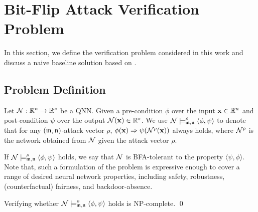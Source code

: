 \section{Bit-Flip Attack Verification Problem}\label{sec:pro}

In this section, we define the verification problem considered in this work and discuss a naive baseline solution based on \deepPoly.

\subsection{Problem Definition}\label{sec:proDef}

\begin{definition}
Let ${\mathcal{N}}:\mathbb{R}^n\rightarrow\mathbb{R}^s$ be a QNN. Given a pre-condition $\phi$ over the input ${\mathbf{x}}\in\mathbb{R}^n$ and post-condition $\psi$ over the output ${\mathcal{N}}({\mathbf{x}})\in\mathbb{R}^s$. We use ${\mathcal{N}} \models^\rho_{\mathfrak{m},\mathfrak{n}} \langle \phi,\psi\rangle$ to denote that for any $(\mathfrak{m},\mathfrak{n})$-attack vector $\rho$, $\phi({\mathbf{x}})\Rightarrow \psi({\mathcal{N}}^\rho({\mathbf{x}}))$ always holds, where ${\mathcal{N}}^\rho$ is the network obtained from ${\mathcal{N}}$ given the attack vector $\rho$.
\end{definition}

If ${\mathcal{N}} \models^\rho_{\mathfrak{m},\mathfrak{n}} \langle \phi,\psi\rangle$ holds,  we say that ${\mathcal{N}}$ is BFA-tolerant to the property $\langle \psi,\phi\rangle$. Note that, such a formulation of the problem is expressive enough to cover a range of desired neural network properties, including safety, robustness, (counterfactual) fairness, and backdoor-absence.


\begin{theorem}\label{the:npc}
Verifying whether ${\mathcal{N}} \models^\rho_{\mathfrak{m},\mathfrak{n}} \langle \phi,\psi\rangle$ holds is NP-complete. \hfill \qed
\end{theorem}


